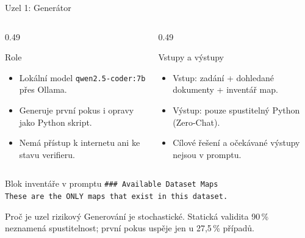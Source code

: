 \documentclass[aspectratio=169,10pt]{beamer}
\begin{document}
\begin{frame}[t]{Uzel 1: Generátor}
  \small
  \begin{columns}[T,onlytextwidth]
    \begin{column}{0.49\textwidth}
      \begin{block}{Role}
        \begin{itemize}
          \item Lokální model \texttt{qwen2.5-coder:7b} přes Ollama.
          \item Generuje první pokus i opravy jako Python skript.
          \item Nemá přístup k internetu ani ke stavu verifieru.
        \end{itemize}
      \end{block}
    \end{column}
    \begin{column}{0.49\textwidth}
      \begin{block}{Vstupy a výstupy}
        \begin{itemize}
          \item Vstup: zadání + dohledané dokumenty + inventář map.
          \item Výstup: pouze spustitelný Python (Zero-Chat).
          \item Cílové řešení a očekávané výstupy nejsou v promptu.
        \end{itemize}
      \end{block}
    \end{column}
  \end{columns}

  \begin{exampleblock}{Blok inventáře v promptu}
    \texttt{\#\#\# Available Dataset Maps}\\
    \texttt{These are the ONLY maps that exist in this dataset.}
  \end{exampleblock}

  \begin{alertblock}{Proč je uzel rizikový}
    Generování je stochastické. Statická validita 90\,\% neznamená
    spustitelnost; první pokus uspěje jen u 27{,}5\,\% případů.
  \end{alertblock}
\end{frame}
\end{document}

